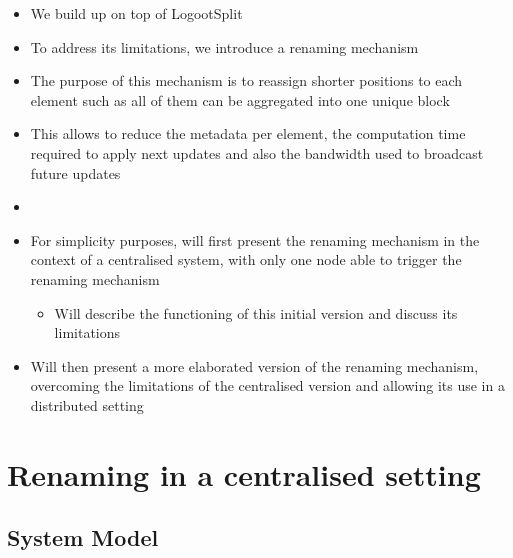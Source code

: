 \documentclass{article}
\begin{document}
\begin{itemize}
    \item We build up on top of LogootSplit
    \item To address its limitations, we introduce a renaming mechanism
    \item The purpose of this mechanism is to reassign shorter positions to each element such as all of them can be aggregated into one unique block
    \item This allows to reduce the metadata per element, the computation time required to apply next updates and also the bandwidth used to broadcast future updates
    \item {}
    \item For simplicity purposes, will first present the renaming mechanism in the context of a centralised system, with only one node able to trigger the renaming mechanism
    \begin{itemize}
        \item Will describe the functioning of this initial version and discuss its limitations
    \end{itemize}
    \item Will then present a more elaborated version of the renaming mechanism, overcoming the limitations of the centralised version and allowing its use in a distributed setting
\end{itemize}

\section{Renaming in a centralised setting}

\subsection{System Model}

\end{document}
